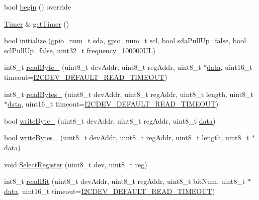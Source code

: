\begin{DoxyCompactItemize}
\item 
bool \mbox{\hyperlink{classperif_1_1LidarMap_a1d0db064c7664aa8014cbd9fe42773ff}{begin}} () override
\item 
\mbox{\hyperlink{classTimer}{Timer}} \& \mbox{\hyperlink{classperif_1_1Perif_a29c48598a861d85256c30e28af67f864}{get\+Timer}} ()
\item 
bool \mbox{\hyperlink{classI2Cdev_a794a92b925f7970399f8b148caa5eef8}{initialize}} (gpio\+\_\+num\+\_\+t sda, gpio\+\_\+num\+\_\+t scl, bool sda\+Pull\+Up=false, bool scl\+Pull\+Up=false, uint32\+\_\+t frequency=100000\+U\+L)
\item 
int8\+\_\+t \mbox{\hyperlink{classI2Cdev_a74447cfadf4d5054ba29b726afcdecd0}{read\+Byte\+\_\+}} (uint8\+\_\+t dev\+Addr, uint8\+\_\+t reg\+Addr, uint8\+\_\+t $\ast$\mbox{\hyperlink{classperif_1_1PerifBase_a1a3afaa535fda17e9f97123fffe78765}{data}}, uint16\+\_\+t timeout=\mbox{\hyperlink{I2Cdev_8h_ad9726bb02451bb8f59d3d2729e4cd20e}{I2\+C\+D\+E\+V\+\_\+\+D\+E\+F\+A\+U\+L\+T\+\_\+\+R\+E\+A\+D\+\_\+\+T\+I\+M\+E\+O\+UT}})
\item 
int8\+\_\+t \mbox{\hyperlink{classI2Cdev_a3fae6b1ae9e9398b682eb7bdf6b43561}{read\+Bytes\+\_\+}} (uint8\+\_\+t dev\+Addr, uint8\+\_\+t reg\+Addr, uint8\+\_\+t length, uint8\+\_\+t $\ast$\mbox{\hyperlink{classperif_1_1PerifBase_a1a3afaa535fda17e9f97123fffe78765}{data}}, uint16\+\_\+t timeout=\mbox{\hyperlink{I2Cdev_8h_ad9726bb02451bb8f59d3d2729e4cd20e}{I2\+C\+D\+E\+V\+\_\+\+D\+E\+F\+A\+U\+L\+T\+\_\+\+R\+E\+A\+D\+\_\+\+T\+I\+M\+E\+O\+UT}})
\item 
bool \mbox{\hyperlink{classI2Cdev_a97645c5d6a3e295bb72b9ee5ab810d12}{write\+Byte\+\_\+}} (uint8\+\_\+t dev\+Addr, uint8\+\_\+t reg\+Addr, uint8\+\_\+t \mbox{\hyperlink{classperif_1_1PerifBase_a1a3afaa535fda17e9f97123fffe78765}{data}})
\item 
bool \mbox{\hyperlink{classI2Cdev_a2f9176cd44c3163ca3929ac1c2ff601b}{write\+Bytes\+\_\+}} (uint8\+\_\+t dev\+Addr, uint8\+\_\+t reg\+Addr, uint8\+\_\+t length, uint8\+\_\+t $\ast$\mbox{\hyperlink{classperif_1_1PerifBase_a1a3afaa535fda17e9f97123fffe78765}{data}})
\item 
void \mbox{\hyperlink{classI2Cdev_a3be31bf7d3f40bb215d8854aac945db3}{Select\+Register}} (uint8\+\_\+t dev, uint8\+\_\+t reg)
\item 
int8\+\_\+t \mbox{\hyperlink{classI2Cdev_ab028a4f330f4f31dc8af9890431a2a63}{read\+Bit}} (uint8\+\_\+t dev\+Addr, uint8\+\_\+t reg\+Addr, uint8\+\_\+t bit\+Num, uint8\+\_\+t $\ast$\mbox{\hyperlink{classperif_1_1PerifBase_a1a3afaa535fda17e9f97123fffe78765}{data}}, uint16\+\_\+t timeout=\mbox{\hyperlink{I2Cdev_8h_ad9726bb02451bb8f59d3d2729e4cd20e}{I2\+C\+D\+E\+V\+\_\+\+D\+E\+F\+A\+U\+L\+T\+\_\+\+R\+E\+A\+D\+\_\+\+T\+I\+M\+E\+O\+UT}})

\end{DoxyCompactItemize}
